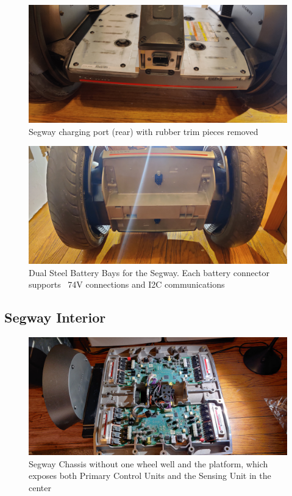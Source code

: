 \documentclass[]{formalLabReport}
\begin{document}
\begin{figure}
    \includegraphics[angle=180]{segwayRear.jpg}
    \caption{Segway charging port (rear) with rubber trim pieces removed}
    \label{fig:segwayRear.jpg}
\end{figure}

\begin{figure}
    \includegraphics[]{segwayBottom.jpg}
    \caption{Dual Steel Battery Bays for the Segway. Each battery connector supports ~74V connections and I2C communications}
    \label{fig:segwayBottom.jpg}
\end{figure}

\subsection{Segway Interior}

\begin{figure}
    \includegraphics[]{segwayInternalsTop.jpg}
    \caption{Segway Chassis without one wheel well and the platform, which exposes both Primary Control Units and the Sensing Unit in the center}
    \label{fig:segwayInternalsTop.jpg}
\end{figure}
\end{document}
